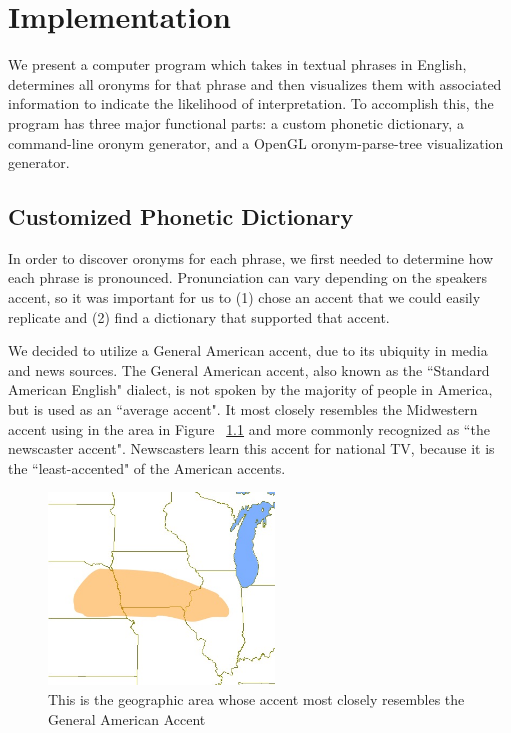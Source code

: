 \chapter{Implementation}
\label{implementation}
We present a computer program which takes in textual phrases in English, determines all oronyms for that phrase and then visualizes them with associated information to indicate the likelihood of interpretation.
To accomplish this, the program has three major functional parts: a custom phonetic dictionary, a command-line oronym generator, and a OpenGL oronym-parse-tree visualization generator.

\section{Customized Phonetic Dictionary} 
\label{section:Implementation:customizedPhoneticDictionary}

In order to discover oronyms for each phrase, we first needed to determine how each phrase is pronounced.  Pronunciation can vary depending on the speakers accent, so it was important for us to (1) chose an accent that we could easily replicate and (2) find a dictionary that supported that accent.  

We decided to utilize a General American accent, due to its ubiquity in media and news sources. The General American accent, also known as the ``Standard American English" dialect, is not spoken by the majority of people in America, but is used as an ``average accent".  It most closely resembles the Midwestern accent using in the area in Figure ~\ref{fig:generalAmericanMap} and more commonly recognized as ``the newscaster accent". Newscasters learn this accent for national TV, because it is the ``least-accented" of the American accents.  

\begin{center}
\begin{figure}
\includegraphics[width=60mm]{General_American.jpg}
\captionfonts
\caption[Geographic Origin of General American]{This is the geographic area whose accent most closely resembles the General American Accent \cite{generalAmericanAccentMap} }
\label{fig:generalAmericanMap}
\end{figure}
\end{center}

